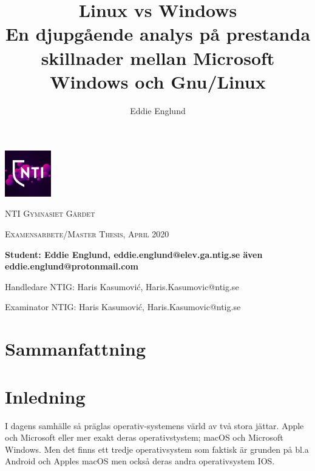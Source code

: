 \documentclass[a4paper, 12pt]{report}
\author{Eddie Englund}
\title{Linux vs Windows\\[0.2em]\smaller{}En djupgående analys på prestanda skillnader mellan Microsoft Windows och Gnu/Linux}
\begin{document}
\begin{titlepage}

    \maketitle

    \begin{center}

    
        \includegraphics[width=0.15\textwidth]{nti}\par\vspace{1cm}

    {\scshape\LARGE NTI Gymnasiet Gärdet \par}
    \vspace{1cm}
    {\scshape\Large Examensarbete/Master Thesis, April 2020\par}
	\vspace{1.5cm}
    \textbf{
    Student: Eddie Englund, eddie.englund@elev.ga.ntig.se även eddie.englund@protonmail.com}
    \vspace{0.2cm}

    Handledare NTIG: Haris Kasumović, Haris.Kasumovic@ntig.se
    \vspace{0.1cm}

    Examinator NTIG: Haris Kasumović, Haris.Kasumovic@ntig.se
    
    \end{center}
\end{titlepage}


\section{Sammanfattning}\label{sum}

    \begin{abstract}

    \end{abstract}

\tableofcontents



\section{Inledning}


    I dagens samhälle så präglas operativ-systemens värld av två stora jättar. Apple och Microsoft eller mer exakt deras operativstystem; macOS och Microsoft Windows. Men det finns ett tredje operativsystem som faktisk är grunden på bl.a Android och Apples macOS men också deras andra operativsystem IOS.
\end{document}
